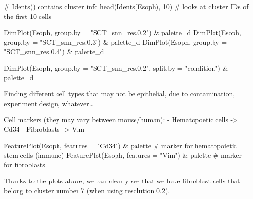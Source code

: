 \documentclass[
  letterpaper,
  DIV=11,
  numbers=noendperiod]{scrreprt}
\newenvironment{Shaded}{\begin{snugshade}}{\end{snugshade}}
\newcommand{\AttributeTok}[1]{\textcolor[rgb]{0.40,0.45,0.13}{#1}}
\newcommand{\CommentTok}[1]{\textcolor[rgb]{0.37,0.37,0.37}{#1}}
\newcommand{\DecValTok}[1]{\textcolor[rgb]{0.68,0.00,0.00}{#1}}
\newcommand{\FunctionTok}[1]{\textcolor[rgb]{0.28,0.35,0.67}{#1}}
\newcommand{\NormalTok}[1]{\textcolor[rgb]{0.00,0.23,0.31}{#1}}
\newcommand{\SpecialCharTok}[1]{\textcolor[rgb]{0.37,0.37,0.37}{#1}}
\newcommand{\StringTok}[1]{\textcolor[rgb]{0.13,0.47,0.30}{#1}}
\begin{document}
\begin{Shaded}
\begin{Highlighting}[]
\CommentTok{\# Idents() contains cluster info}
\FunctionTok{head}\NormalTok{(}\FunctionTok{Idents}\NormalTok{(Esoph), }\DecValTok{10}\NormalTok{) }\CommentTok{\# looks at cluster IDs of the first 10 cells}
\end{Highlighting}
\end{Shaded}

\begin{Shaded}
\begin{Highlighting}[]
\FunctionTok{DimPlot}\NormalTok{(Esoph, }\AttributeTok{group.by =} \StringTok{"SCT\_snn\_res.0.2"}\NormalTok{) }\SpecialCharTok{\&}\NormalTok{ palette\_d}
\FunctionTok{DimPlot}\NormalTok{(Esoph, }\AttributeTok{group.by =} \StringTok{"SCT\_snn\_res.0.3"}\NormalTok{) }\SpecialCharTok{\&}\NormalTok{ palette\_d}
\FunctionTok{DimPlot}\NormalTok{(Esoph, }\AttributeTok{group.by =} \StringTok{"SCT\_snn\_res.0.4"}\NormalTok{) }\SpecialCharTok{\&}\NormalTok{ palette\_d}

\FunctionTok{DimPlot}\NormalTok{(Esoph, }\AttributeTok{group.by =} \StringTok{"SCT\_snn\_res.0.2"}\NormalTok{, }\AttributeTok{split.by =} \StringTok{"condition"}\NormalTok{) }\SpecialCharTok{\&}\NormalTok{ palette\_d}
\end{Highlighting}
\end{Shaded}

Finding different cell types that may not be epithelial, due to
contamination, experiment design, whatever\ldots{}

Cell markers (they may vary between mouse/human): - Hematopoetic cells
-\textgreater{} Cd34 - Fibroblasts -\textgreater{} Vim

\begin{Shaded}
\begin{Highlighting}[]
\FunctionTok{FeaturePlot}\NormalTok{(Esoph, }\AttributeTok{features =} \StringTok{"Cd34"}\NormalTok{) }\SpecialCharTok{\&}\NormalTok{ palette }\CommentTok{\# marker for hematopoietic stem cells (immune)}
\FunctionTok{FeaturePlot}\NormalTok{(Esoph, }\AttributeTok{features =} \StringTok{"Vim"}\NormalTok{) }\SpecialCharTok{\&}\NormalTok{ palette }\CommentTok{\# marker for fibroblasts}
\end{Highlighting}
\end{Shaded}

Thanks to the plots above, we can clearly see that we have fibroblast
cells that belong to cluster number 7 (when using resolution 0.2).
\end{document}
